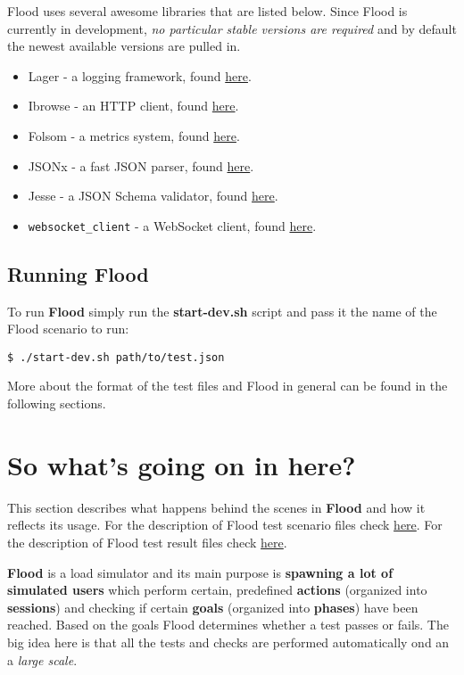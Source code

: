 \documentclass[a4paper]{article}
\begin{document}
Flood uses several awesome libraries that are listed below. Since Flood is currently in development, \emph{no particular stable versions are required} and by default the newest available versions are pulled in.


\begin{itemize}
\item Lager - a logging framework, found \href{https://github.com/basho/lager}{here}.
\item Ibrowse - an HTTP client, found \href{https://github.com/cmullaparthi/ibrowse}{here}.
\item Folsom - a metrics system, found \href{https://github.com/boundary/folsom}{here}.
\item JSONx - a fast JSON parser, found \href{https://github.com/iskra/jsonx}{here}.
\item Jesse - a JSON Schema validator, found \href{https://github.com/alertlogic/jesse}{here}.
\item \texttt{websocket\_client} - a WebSocket client, found \href{https://github.com/jeremyong/websocket_client}{here}.
\end{itemize}
\subsection{Running Flood}
\label{sec-1-4}

To run \textbf{Flood} simply run the \textbf{start-dev.sh} script and pass it the name of the Flood scenario to run:


\begin{verbatim}
$ ./start-dev.sh path/to/test.json
\end{verbatim}



\noindent
More about the format of the test files and Flood in general can be found in the following sections.

\pagebreak
\section{So what's going on in here?}
\label{sec-2}

This section describes what happens behind the scenes in \textbf{Flood} and how it reflects its usage. For the description of Flood test scenario files check \hyperref[sec-3]{here}. For the description of Flood test result files check \hyperref[sec-4]{here}.

\noindent
\textbf{Flood} is a load simulator and its main purpose is \textbf{spawning a lot of simulated users} which perform certain, predefined \textbf{actions} (organized into \textbf{sessions}) and checking if certain \textbf{goals} (organized into \textbf{phases}) have been reached. Based on the goals Flood determines whether a test passes or fails. The big idea here is that all the tests and checks are performed automatically ond an a \emph{large scale}.
\end{document}
